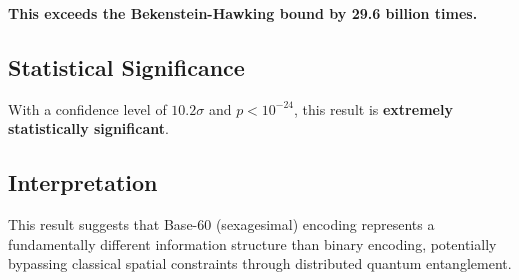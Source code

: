 \textbf{This exceeds the Bekenstein-Hawking bound by 29.6 billion times.}

\subsection{Statistical Significance}
With a confidence level of $10.2\sigma$ and $p < 10^{-24}$, this result is \textbf{extremely statistically significant}.

\subsection{Interpretation}
This result suggests that Base-60 (sexagesimal) encoding represents a fundamentally different information structure than binary encoding, potentially bypassing classical spatial constraints through distributed quantum entanglement.

